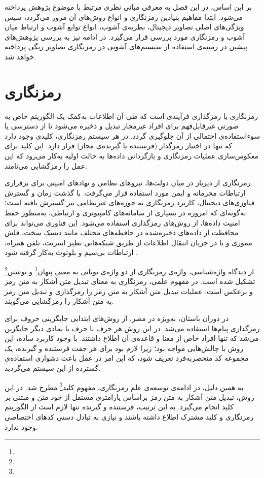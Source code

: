 بر این اساس، در این فصل به معرفی مبانی نظری مرتبط با موضوع پژوهش پرداخته می‌شود. ابتدا مفاهیم بنیادین رمزنگاری و انواع روش‌های آن مرور می‌گردد، سپس ویژگی‌های اصلی تصاویر دیجیتال، نظریه‌ی آشوب، انواع توابع آشوب و ارتباط میان آشوب و رمزنگاری مورد بررسی قرار می‌گیرد. در ادامه نیز به بررسی پژوهش‌های پیشین در زمینه‌ی استفاده از سیستم‌های آشوبی در رمزنگاری تصاویر رنگی پرداخته خواهد شد.

\section{رمزنگاری}

رمزنگاری یا رمزگذاری فرآیندی است که طی آن اطلاعات به‌کمک یک الگوریتم خاص به صورتی غیرقابل‌فهم برای افراد غیرمجاز تبدیل و ذخیره می‌شود تا از دسترسی یا سوء‌استفاده‌ی احتمالی از آن جلوگیری گردد. در هر سیستم رمزنگاری، کلیدی وجود دارد که تنها در اختیار رمزگذار (فرستنده یا گیرنده‌ی مجاز) قرار دارد. این کلید برای معکوس‌سازی عملیات رمزنگاری و بازگردانی داده‌ها به حالت اولیه به‌کار می‌رود که این عمل را رمزگشایی می‌نامند.

رمزنگاری از دیرباز در میان دولت‌ها، نیروهای نظامی و نهادهای امنیتی برای برقراری ارتباطات محرمانه و ایمن مورد استفاده قرار می‌گرفت. با گذشت زمان و گسترش فناوری‌های دیجیتال، کاربرد رمزنگاری به حوزه‌های غیرنظامی نیز گسترش یافته است؛ به‌گونه‌ای که امروزه در بسیاری از سامانه‌های کامپیوتری و ارتباطی، به‌منظور حفظ امنیت داده‌ها، از روش‌های رمزگذاری استفاده می‌شود. این فناوری می‌تواند برای محافظت از داده‌های ذخیره‌شده در حافظه‌های مختلف مانند دیسک سخت، فلش مموری و یا در جریان انتقال اطلاعات از طریق شبکه‌هایی نظیر اینترنت، تلفن همراه، ارتباطات بی‌سیم و بلوتوث به‌کار گرفته شود \cite{ref14}.

از دیدگاه واژه‌شناسی، واژه‌ی رمزنگاری از دو واژه‌ی یونانی به معنی پنهان\footnote{} و نوشتن\footnote{} تشکیل شده است. در مفهوم علمی، رمزنگاری به معنای تبدیل متن آشکار  به متن رمز و برعکس است. عملیات تبدیل متن آشکار به متن رمز را رمزگذاری و تبدیل متن رمز به متن آشکار را رمزگشایی می‌گویند.

در دوران باستان، به‌ویژه در مصر، از روش‌های ابتدایی جایگزینی حروف برای رمزگذاری پیام‌ها استفاده می‌شد. در این روش هر حرف با حرف یا نمادی دیگر جایگزین می‌شد که تنها افراد خاص از معنا و قاعده‌ی آن اطلاع داشتند. با وجود کاربرد ساده، این روش با چالش‌هایی مواجه بود؛ زیرا لازم بود برای هر جفت فرستنده و گیرنده، یک مجموعه کد منحصربه‌فرد تعریف شود، که این امر در عمل باعث دشواری استفاده‌ی گسترده از این سیستم می‌گردید\cite{ref15}.

به همین دلیل، در ادامه‌ی توسعه‌ی علم رمزنگاری، مفهوم کلید\footnote{} مطرح شد. در این روش، تبدیل متن آشکار به متن رمز براساس پارامتری مستقل از خود متن و مبتنی بر کلید انجام می‌گیرد. به این ترتیب، فرستنده و گیرنده تنها لازم است از الگوریتم رمزنگاری و کلید مشترک اطلاع داشته باشند و نیازی به تبادل دستی کدهای اختصاصی وجود ندارد.

